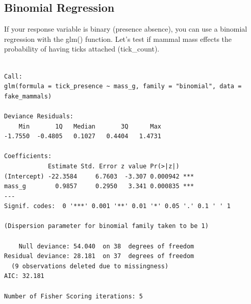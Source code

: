 \documentclass[
  letterpaper,
  DIV=11,
  numbers=noendperiod]{scrreprt}
\newenvironment{Shaded}{\begin{snugshade}}{\end{snugshade}}
\newcommand{\AttributeTok}[1]{\textcolor[rgb]{0.40,0.45,0.13}{#1}}
\newcommand{\DecValTok}[1]{\textcolor[rgb]{0.68,0.00,0.00}{#1}}
\newcommand{\DocumentationTok}[1]{\textcolor[rgb]{0.37,0.37,0.37}{\textit{#1}}}
\newcommand{\FunctionTok}[1]{\textcolor[rgb]{0.28,0.35,0.67}{#1}}
\newcommand{\NormalTok}[1]{\textcolor[rgb]{0.00,0.23,0.31}{#1}}
\newcommand{\OtherTok}[1]{\textcolor[rgb]{0.00,0.23,0.31}{#1}}
\newcommand{\SpecialCharTok}[1]{\textcolor[rgb]{0.37,0.37,0.37}{#1}}
\newcommand{\StringTok}[1]{\textcolor[rgb]{0.13,0.47,0.30}{#1}}
\begin{document}
\hypertarget{binomial-regression}{%
\subsection{Binomial Regression}\label{binomial-regression}}

If your response variable is binary (presence absence), you can use a
binomial regression with the glm() function. Let's test if mammal mass
effects the probability of having ticks attached (tick\_count).

\begin{Shaded}
\end{Shaded}

\begin{verbatim}

Call:
glm(formula = tick_presence ~ mass_g, family = "binomial", data = fake_mammals)

Deviance Residuals: 
    Min       1Q   Median       3Q      Max  
-1.7550  -0.4805   0.1027   0.4404   1.4731  

Coefficients:
            Estimate Std. Error z value Pr(>|z|)    
(Intercept) -22.3584     6.7603  -3.307 0.000942 ***
mass_g        0.9857     0.2950   3.341 0.000835 ***
---
Signif. codes:  0 '***' 0.001 '**' 0.01 '*' 0.05 '.' 0.1 ' ' 1

(Dispersion parameter for binomial family taken to be 1)

    Null deviance: 54.040  on 38  degrees of freedom
Residual deviance: 28.181  on 37  degrees of freedom
  (9 observations deleted due to missingness)
AIC: 32.181

Number of Fisher Scoring iterations: 5
\end{verbatim}
\end{document}
